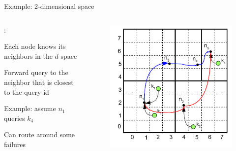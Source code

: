 \begin{frame}{Example: 2-dimensional space}

\begin{columns}
\begin{column}{0.5\textwidth}
:\\
\BI
\item Each node knows its neighbors in the $d$-space
\item Forward query to the neighbor that is closest to the query id
\item Example: assume $n_1$ queries $k_4$
\item Can route around some failures
\EI
\end{column}
\begin{column}{0.5\textwidth}
\begin{figure}
	\includegraphics[width=1.0\textwidth]{can6}
\end{figure}
\end{column}
\end{columns}
		
\end{frame}	

